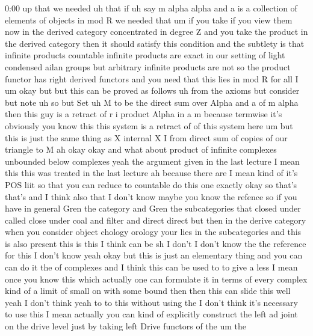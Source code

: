 \begin{unfinished}{0:00}
up  that  we  needed  uh  that  if  uh  say  m
alpha  alpha  and  a  is  a  collection  of
elements  of
objects  in  mod
R  we  needed
that  um  if  you  take  if  you  view  them  now
in  the  derived  category  concentrated  in
degree  Z  and  you  take  the  product  in  the
derived  category  then  it  should  satisfy
this  condition  and  the  subtlety  is  that
infinite  products  countable  infinite
products  are  exact  in  our  setting  of
light  condensed  ailan  groups  but
arbitrary  infinite  products  are  not  so
the  product  functor  has  right  derived
functors  and  you  need  that  this  lies  in
mod  R  for  all
I
um  okay  but  but  this  can  be  proved  as
follows  uh  from  the  axioms  but  consider
but  note  uh  so  but  Set  uh  M  to  be  the
direct  sum  over  Alpha  and  a  of  m
alpha  then  this  guy  is  a
retract
of  r  i  product  Alpha  in  a
m  because  termwise  it's  obviously  you
know  this  this  system  is  a  retract  of  of
this  system  here  um  but  this  is  just  the
same  thing  as  X  internal  X
I  from  direct  sum  of
copies  of  our  triangle  to
M  ah  okay
okay  and  what  about  product  of  infinite
complexes  unbounded  below  complexes  yeah
the  argument  given  in  the  last  lecture  I
mean  this  this  was  treated  in  the  last
lecture  ah  because  there  are  I  mean  kind
of  it's  POS  liit  so  that  you  can  reduce
to  countable  do  this  one
exactly  okay  so  that's  that's  and  I
think  also  that  I  don't  know  maybe  you
know  the  refence  so  if  you  have  in
general  Gren  the  category  and  Gren  the
subcategories  that  closed
under  called  close  under  coal  and  filter
and  direct  direct  but  then  in  the  derive
category  when  you  consider  object
chology  orology  your  lies  in  the
subcategories  and  this  is  also
present  this  is  this  I  think  can  be  sh  I
don't  I  don't  know  the  the  reference  for
this  I  don't  know  yeah  okay  but  this  is
just  an  elementary  thing  and  you  can  can
do  it  the  of  complexes  and  I  think  this
can  be  used  to  to  give  a  less  I  mean
once  you  know  this  which  actually  one
can  formulate  it  in  terms  of  every
complex  kind  of  a  limit  of  small  on  with
some
bound  then  then  this  can  slide  this  well
yeah  I  don't  think  yeah  to  to  this
without  using  the  I  don't  think  it's
necessary  to  use  this  I  mean  actually
you  can  kind  of  explicitly  construct  the
left  ad  joint  on  the  drive  level  just  by
taking  left  Drive  functors  of  the  um  the

\end{unfinished}
